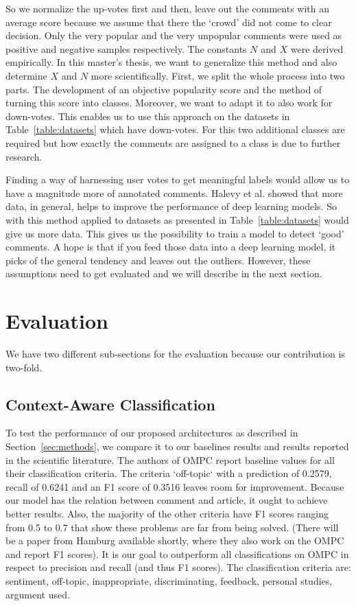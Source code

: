 So we normalize the up-votes first and then, leave out the comments with an average score because we assume that there the `crowd' did not come to clear decision. Only the very popular and the very unpopular comments were used as positive and negative samples respectively. The constants $N$ and $X$ were derived empirically. In this master's thesis, we want to generalize this method and also determine $X$ and $N$ more scientifically. First, we split the whole process into two parts. The development of an objective popularity score and the method of turning this score into classes. Moreover, we want to adapt it to also work for down-votes. This enables us to use this approach on the datasets in Table~\ref{table:datasets} which have down-votes. For this two additional classes are required but how exactly the comments are assigned to a class is due to further research. 

Finding a way of harnessing user votes to get meaningful labels would allow us to have a magnitude more of annotated comments. Halevy et al. \cite{halevy2009unreasonable} showed that more data, in general, helps to improve the performance of deep learning models. So with this method applied to datasets as presented in Table~\ref{table:datasets} would give us more data. This gives us the possibility to train a model to detect `good' comments. A hope is that if you feed those data into a deep learning model, it picks of the general tendency and leaves out the outliers. However, these assumptions need to get evaluated and we will describe in the next section.

\section{Evaluation}

 We have two different sub-sections for the evaluation because our contribution is two-fold.

\subsection{Context-Aware Classification}
To test the performance of our proposed architectures as described in Section~\ref{sec:methods}, we compare it to our baselines results and results reported in the scientific literature. The authors of OMPC report baseline values \cite{schabus_academic-industrial_nodate} for all their classification criteria. The criteria `off-topic` with a prediction of 0.2579,  recall of 0.6241 and an F1 score of 0.3516 leaves room for improvement. Because our model has the relation between comment and article, it ought to achieve better results. Also, the majority of the other criteria have F1 scores ranging from 0.5 to 0.7 that show these problems are far from being solved. (There will be a paper from Hamburg available shortly, where they also work on the OMPC and report F1 scores). It is our goal to outperform all classifications on OMPC in respect to precision and recall (and thus F1 scores). The classification criteria are: sentiment, off-topic, inappropriate, discriminating, feedback, personal studies, argument used.

